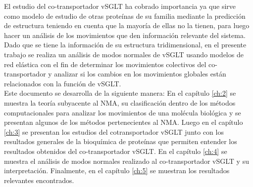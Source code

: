 El estudio del co-transportador vSGLT ha cobrado importancia ya que sirve como modelo de estudio de otras prote\'{i}nas de su familia mediante la predicci\'{o}n de estructura teniendo en cuenta que la mayor\'{i}a de ellas no la tienen, para luego hacer un an\'{a}lisis de los movimientos que den informaci\'{o}n relevante del sistema.\\

Dado que se tiene la informaci\'{o}n de su estructura tridimensional, en el  presente trabajo se realiza un an\'{a}lisis de modos normales de vSGLT usando modelos de red el\'{a}stica con el fin de determinar los movimientos colectivos del co-transportador y analizar si los cambios en los movimientos globales est\'{a}n relacionados con la funci\'{o}n de vSGLT.\\

Este documento se desarrolla de la siguiente manera: En el cap\'{i}tulo \ref{ch:2} se muestra la teor\'{i}a subyacente al NMA, su clasificaci\'{o}n dentro de los m\'{e}todos computacionales para analizar los movimientos de una mol\'{e}cula biol\'{o}gica y se presentan algunos de los m\'{e}todos pertenecientes al NMA. Luego en el cap\'{i}tulo \ref{ch:3} se presentan los estudios del cotransportador vSGLT junto con los resultados generales de la bioqu\'{i}mica de prote\'{i}nas que permiten entender los resultados obtenidos del co-transportador vSGLT. En el cap\'{i}tulo \ref{ch:4} se muestra el an\'{a}lisis de modos normales realizado al co-transportador vSGLT y su interpretaci\'{o}n. Finalmente, en el cap\'{i}tulo \ref{ch:5} se muestran los resultados relevantes encontrados.\\
